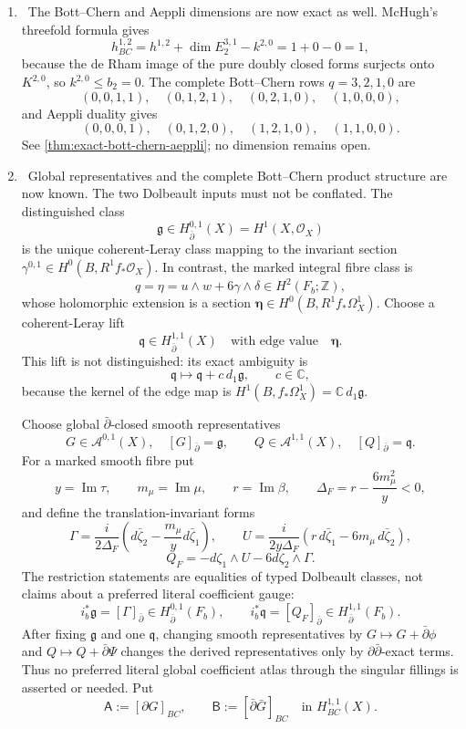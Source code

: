 \begin{enumerate}[leftmargin=1.8em]
\item \Verified\ The Bott--Chern and Aeppli dimensions are now exact as
well.  McHugh's threefold formula gives
\[
h^{1,2}_{BC}=h^{1,2}+\dim E_2^{3,1}-k^{2,0}=1+0-0=1,
\]
because the de Rham image of the pure doubly closed forms surjects onto
$K^{2,0}$, so $k^{2,0}\le b_2=0$.  The complete Bott--Chern rows
$q=3,2,1,0$ are
\[
(0,0,1,1),\quad(0,1,2,1),\quad(0,2,1,0),\quad(1,0,0,0),
\]
and Aeppli duality gives
\[
(0,0,0,1),\quad(0,1,2,0),\quad(1,2,1,0),\quad(1,1,0,0).
\]
See \cref{thm:exact-bott-chern-aeppli}; no dimension remains open.

\item \Verified\ Global representatives and the complete Bott--Chern
product structure are now known.  The two Dolbeault inputs must not be
conflated.  The distinguished class
\[
 \mathfrak g\in H^{0,1}_{\bar\partial}(X)=H^1(X,\mathcal O_X)
\]
is the unique coherent-Leray class mapping to the invariant section
\(\gamma^{0,1}\in H^0(B,R^1f_*\mathcal O_X)\).  In contrast, the marked
integral fibre class is
\[
 q=\eta=u\wedge w+6\gamma\wedge\delta\in H^2(F_b;\mathbb Z),
\]
whose holomorphic extension is a section
\(\boldsymbol\eta\in H^0(B,R^1f_*\Omega_X^1)\).  Choose a coherent-Leray
lift
\[
 \mathfrak q\in H^{1,1}_{\bar\partial}(X)
 \quad\text{with edge value}\quad \boldsymbol\eta.
\]
This lift is not distinguished: its exact ambiguity is
\[
 \mathfrak q\longmapsto\mathfrak q+c\,d_1\mathfrak g,
 \qquad c\in\mathbb C,
\]
because the kernel of the edge map is
\(H^1(B,f_*\Omega_X^1)=\mathbb C\,d_1\mathfrak g\).

Choose global \(\bar\partial\)-closed smooth representatives
\[
 G\in\mathcal A^{0,1}(X),\quad [G]_{\bar\partial}=\mathfrak g,
 \qquad
 Q\in\mathcal A^{1,1}(X),\quad [Q]_{\bar\partial}=\mathfrak q.
\]
For a marked smooth fibre put
\[
 y=\operatorname{Im}\tau,\qquad m_\mu=\operatorname{Im}\mu,\qquad
 r=\operatorname{Im}\beta,\qquad
 \Delta_F=r-\frac{6m_\mu^2}{y}<0,
\]
and define the translation-invariant forms
\[
 \Gamma=\frac{i}{2\Delta_F}
 \left(d\bar\zeta_2-\frac{m_\mu}{y}d\bar\zeta_1\right),
 \qquad
 U=\frac{i}{2y\Delta_F}
 \left(r\,d\bar\zeta_1-6m_\mu\,d\bar\zeta_2\right),
\]
\[
 Q_F=-d\zeta_1\wedge U-6d\zeta_2\wedge\Gamma.
\]
The restriction statements are equalities of typed Dolbeault classes,
not claims about a preferred literal coefficient gauge:
\[
 i_b^*\mathfrak g=[\Gamma]_{\bar\partial}
   \in H^{0,1}_{\bar\partial}(F_b),
 \qquad
 i_b^*\mathfrak q=[Q_F]_{\bar\partial}
   \in H^{1,1}_{\bar\partial}(F_b).
\]
After fixing \(\mathfrak g\) and one \(\mathfrak q\), changing smooth
representatives by
\(G\mapsto G+\bar\partial\phi\) and
\(Q\mapsto Q+\bar\partial\Psi\) changes the derived representatives only
by \(\partial\bar\partial\)-exact terms.  Thus no preferred literal global
coefficient atlas through the singular fillings is asserted or needed.
Put
\[
 \mathsf A:=[\partial G]_{BC},\qquad
 \mathsf B:=[\bar\partial\bar G]_{BC}
 \quad\text{in }H^{1,1}_{BC}(X).
\]


\end{enumerate}
